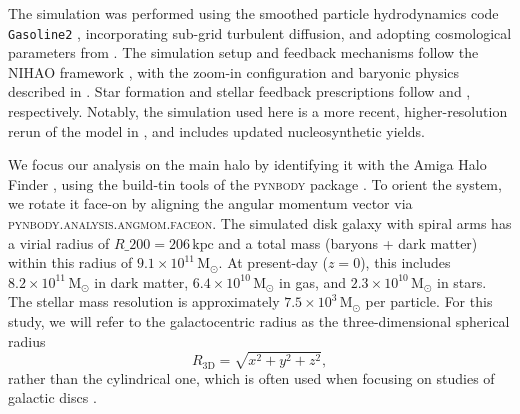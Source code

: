 \documentclass[fleqn,usenatbib]{mnras}
\begin{document}
The simulation was performed using the smoothed particle hydrodynamics code \texttt{Gasoline2} \citep{Wadsley2017}, incorporating sub-grid turbulent diffusion, and adopting cosmological parameters from \citet{Planck2014}. The simulation setup and feedback mechanisms follow the NIHAO framework \citep{Wang2015}, with the zoom-in configuration and baryonic physics described in \citet{Buck2021}. Star formation and stellar feedback prescriptions follow \citet{Stinson2006} and \citet{Stinson2013}, respectively. Notably, the simulation used here is a more recent, higher-resolution rerun of the model in \citet{Buder2024}, and includes updated nucleosynthetic yields.

We focus our analysis on the main halo by identifying it with the Amiga Halo Finder \citep{Knollman2009}, using the build-tin tools of the \textsc{pynbody} package \citep{pynbody}. To orient the system, we rotate it face-on by aligning the angular momentum vector via \textsc{pynbody.analysis.angmom.faceon}. The simulated disk galaxy with spiral arms has a virial radius of $R\_{200} = 206\,\mathrm{kpc}$ and a total mass (baryons + dark matter) within this radius of $9.1 \times 10^{11}\,\mathrm{M_\odot}$. At present-day ($z = 0$), this includes $8.2 \times 10^{11}\,\mathrm{M_\odot}$ in dark matter, $6.4 \times 10^{10}\,\mathrm{M_\odot}$ in gas, and $2.3 \times 10^{10}\,\mathrm{M_\odot}$ in stars. The stellar mass resolution is approximately $7.5 \times 10^3\,\mathrm{M_{\odot}}$ per particle. For this study, we will refer to the galactocentric radius as the three-dimensional spherical radius
\begin{equation}
    R_{\mathrm{3D}} = \sqrt{x^2 + y^2 + z^2},
\end{equation}
rather than the cylindrical one, which is often used when focusing on studies of galactic discs \citep[for example by][for the same simulation]{Buder2025}.
\end{document}

